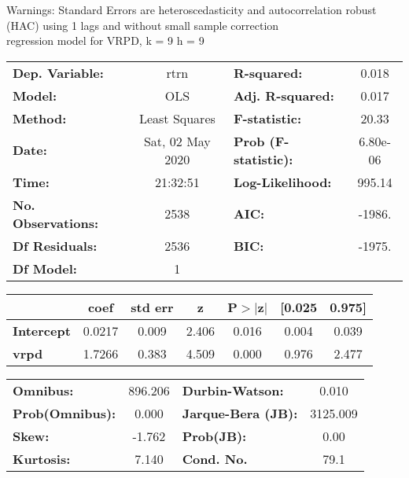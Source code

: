 Warnings: \newline
 [1] Standard Errors are heteroscedasticity and autocorrelation robust (HAC) using 1 lags and without small sample correction\\ 

regression model for VRPD, k = 9 h = 9\begin{center}
\begin{tabular}{lclc}
\toprule
\textbf{Dep. Variable:}    &       rtrn       & \textbf{  R-squared:         } &     0.018   \\
\textbf{Model:}            &       OLS        & \textbf{  Adj. R-squared:    } &     0.017   \\
\textbf{Method:}           &  Least Squares   & \textbf{  F-statistic:       } &     20.33   \\
\textbf{Date:}             & Sat, 02 May 2020 & \textbf{  Prob (F-statistic):} &  6.80e-06   \\
\textbf{Time:}             &     21:32:51     & \textbf{  Log-Likelihood:    } &    995.14   \\
\textbf{No. Observations:} &        2538      & \textbf{  AIC:               } &    -1986.   \\
\textbf{Df Residuals:}     &        2536      & \textbf{  BIC:               } &    -1975.   \\
\textbf{Df Model:}         &           1      & \textbf{                     } &             \\
\bottomrule
\end{tabular}
\begin{tabular}{lcccccc}
                   & \textbf{coef} & \textbf{std err} & \textbf{z} & \textbf{P$> |$z$|$} & \textbf{[0.025} & \textbf{0.975]}  \\
\midrule
\textbf{Intercept} &       0.0217  &        0.009     &     2.406  &         0.016        &        0.004    &        0.039     \\
\textbf{vrpd}      &       1.7266  &        0.383     &     4.509  &         0.000        &        0.976    &        2.477     \\
\bottomrule
\end{tabular}
\begin{tabular}{lclc}
\textbf{Omnibus:}       & 896.206 & \textbf{  Durbin-Watson:     } &    0.010  \\
\textbf{Prob(Omnibus):} &   0.000 & \textbf{  Jarque-Bera (JB):  } & 3125.009  \\
\textbf{Skew:}          &  -1.762 & \textbf{  Prob(JB):          } &     0.00  \\
\textbf{Kurtosis:}      &   7.140 & \textbf{  Cond. No.          } &     79.1  \\
\bottomrule
\end{tabular}
\end{center}

